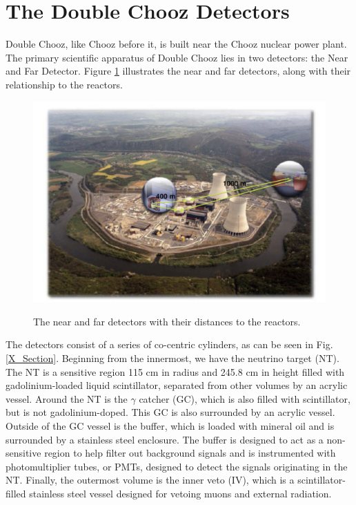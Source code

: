 \section{The Double Chooz Detectors}
 Double Chooz, like Chooz before it, is built near the Chooz nuclear power plant. The primary scientific apparatus of Double Chooz lies in two detectors: the Near and Far Detector. Figure \ref{DC_Picture} illustrates the near and far detectors, along with their relationship to the reactors. 
 \begin{figure}[h!]
  \caption{The near and far detectors \cite{DCWhitepaper} with their distances to the reactors.}
  \centering
    \includegraphics[width=\textwidth]{DC_Results/Chooz_Plant_Edit.jpg}
    \label{DC_Picture}
\end{figure}
 
The detectors consist of a series of co-centric cylinders, as can be seen in Fig. \ref{X_Section}. Beginning from the innermost, we have the neutrino target (NT). The NT is a sensitive region 115 cm in radius and 245.8 cm in height filled with gadolinium-loaded liquid scintillator, separated from other volumes by an acrylic vessel. Around the NT is the $\gamma$ catcher (GC), which is also filled with scintillator, but is not gadolinium-doped.  This GC is also surrounded by an acrylic vessel. Outside of the GC vessel is the buffer, which is loaded with mineral oil and is surrounded by a stainless steel enclosure. The buffer is designed to act as a non-sensitive region to help filter out background signals and is instrumented with photomultiplier tubes, or PMTs, designed to detect the signals originating in the NT. Finally, the outermost volume is the inner veto (IV), which is a scintillator-filled stainless steel vessel designed for vetoing muons and external radiation.



